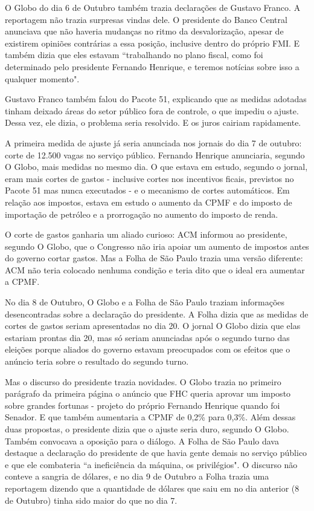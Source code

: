 \documentclass{article}
\begin{document}
O Globo do dia 6 de Outubro também trazia declarações de Gustavo Franco. A reportagem não trazia surpresas vindas dele. O presidente do Banco Central anunciava que não haveria mudanças no ritmo da desvalorização, apesar de existirem opiniões contrárias a essa posição, inclusive dentro do próprio FMI. E também dizia que eles estavam ``trabalhando no plano fiscal, como foi determinado pelo presidente Fernando Henrique, e teremos notícias sobre isso a qualquer momento". 

Gustavo Franco também falou do Pacote 51, explicando que as medidas adotadas tinham deixado áreas do setor público fora de controle, o que impediu o ajuste. Dessa vez, ele dizia, o problema seria resolvido. E os juros cairiam rapidamente.

A primeira medida de ajuste já seria anunciada nos jornais do dia 7 de outubro: corte de 12.500 vagas no serviço público. Fernando Henrique anunciaria, segundo O Globo, mais medidas no mesmo dia. O que estava em estudo, segundo o jornal, eram mais cortes de gastos - inclusive cortes nos incentivos ficais, previstos no Pacote 51 mas nunca executados - e o mecanismo de cortes automáticos. Em relação aos impostos, estava em estudo o aumento da CPMF e do imposto de importação de petróleo e a prorrogação no aumento do imposto de renda.

O corte de gastos ganharia um aliado curioso: ACM informou ao presidente, segundo O Globo, que o Congresso não iria apoiar um aumento de impostos antes do governo cortar gastos. Mas a Folha de São Paulo trazia uma versão diferente: ACM não teria colocado nenhuma condição e teria dito que o ideal era aumentar a CPMF. 

No dia 8 de Outubro, O Globo e a Folha de São Paulo traziam informações desencontradas sobre a declaração do presidente. A Folha dizia que as medidas de cortes de gastos seriam apresentadas no dia 20. O jornal O Globo dizia que elas estariam prontas dia 20, mas só seriam anunciadas após o segundo turno das eleições porque aliados do governo estavam preocupados com os efeitos que o anúncio teria sobre o resultado do segundo turno.

Mas o discurso do presidente trazia novidades. O Globo trazia no primeiro parágrafo da primeira página o anúncio que FHC queria aprovar um imposto sobre grandes fortunas - projeto do próprio Fernando Henrique quando foi Senador. E que também aumentaria a CPMF de 0,2\% para 0,3\%. Além dessas duas propostas, o presidente dizia que o ajuste seria duro, segundo O Globo. Também convocava a oposição para o diálogo. A Folha de São Paulo dava destaque a declaração do presidente de que havia gente demais no serviço público e que ele combateria ``a ineficiência da máquina, os privilégios". O discurso não conteve a sangria de dólares, e no dia 9 de Outubro a Folha trazia uma reportagem dizendo que a quantidade de dólares que saiu em no dia anterior (8 de Outubro) tinha sido maior do que no dia 7.
\end{document}
